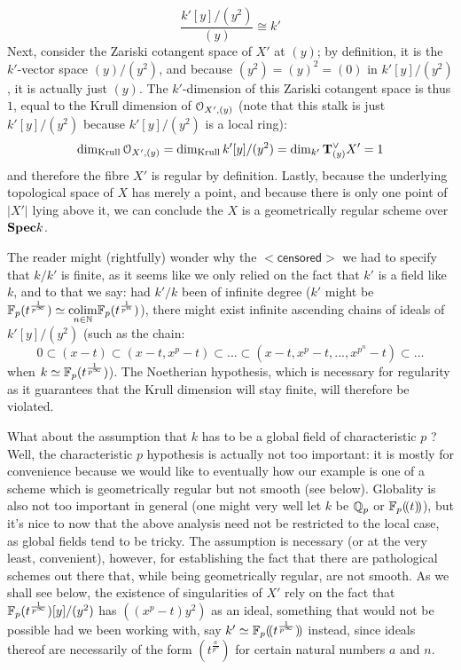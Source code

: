 \begin{example}
\begin{enumerate}
                            $$\frac{k'[y]/(y^2)}{(y)} \cong k'$$
                        Next, consider the Zariski cotangent space of $X'$ at $(y)$; by definition, it is the $k'$-vector space $(y)/(y^2)$, and because $(y^2) = (y)^2 = (0)$ in $k'[y]/(y^2)$, it is actually just $(y)$. The $k'$-dimension of this Zariski cotangent space is thus $1$, equal to the Krull dimension of $\mathcal{O}_{X', (y)}$ (note that this stalk is just $k'[y]/(y^2)$ because $k'[y]/(y^2)$ is a local ring):
                            $$\dim_{\mathrm{Krull}} \mathcal{O}_{X', (y)} = \dim_{\mathrm{Krull}} k'[y]/(y^2) = \dim_{k'} \mathbf{T}^{\vee}_{(y)} X' = 1$$
                        and therefore the fibre $X'$ is regular by definition. Lastly, because the underlying topological space of $X$ has merely a point, and because there is only one point of $|X'|$ lying above it, we can conclude the $X$ is a geometrically regular scheme over $\mathbf{Spec} k$. 
                        
                        The reader might (rightfully) wonder why the $\mathsf{<censored>}$ we had to specify that $k/k'$ is finite, as it seems like we only relied on the fact that $k'$ is a field like $k$, and to that we say: had $k'/k$ been of infinite degree ($k'$ might be $\mathbb{F}_p(t^{\frac{1}{p^{\infty}}}) \simeq \underset{n \in \mathbb{N}}{\operatorname{colim}} \mathbb{F}_p(t^{\frac{1}{p^n}})$), there might exist infinite ascending chains of ideals of $k'[y]/(y^2)$ (such as the chain:
                            $$0 \subset (x - t) \subset (x - t, x^p - t) \subset ... \subset (x - t, x^p - t, ..., x^{p^n} - t) \subset ...$$
                        when $k \simeq \mathbb{F}_p(t^{\frac{1}{p^{\infty}}})$). The Noetherian hypothesis, which is necessary for regularity as it guarantees that the Krull dimension will stay finite, will therefore be violated. 
                        
                        What about the assumption that $k$ has to be a global field of characteristic $p$ ? Well, the characteristic $p$ hypothesis is actually not too important: it is mostly for convenience because we would like to eventually how our example is one of a scheme which is geometrically regular but not smooth (see below). Globality is also not too important in general (one might very well let $k$ be $\mathbb{Q}_p$ or $\mathbb{F}_p(\!(t)\!)$), but it's nice to now that the above analysis need not be restricted to the local case, as global fields tend to be tricky. The assumption is necessary (or at the very least, convenient), however, for establishing the fact that there are pathological schemes out there that, while being geometrically regular, are not smooth. As we shall see below, the existence of singularities of $X'$ rely on the fact that $\mathbb{F}_p(t^{\frac{1}{p^{\infty}}})[y]/(y^2)$ has $\left((x^p - t)y^2\right)$ as an ideal, something that would not be possible had we been working with, say $k' \simeq \mathbb{F}_p(\!(t^{\frac{1}{p^{\infty}}})\!)$ instead, since ideals thereof are necessarily of the form $(t^{\frac{a}{p^n}})$ for certain natural numbers $a$ and $n$. 
                        

\end{enumerate}
\end{example}
